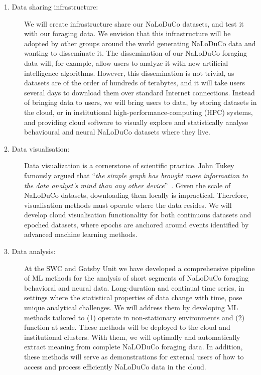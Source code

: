 \begin{description}

    \item[1. Data sharing infrastructure:] We will create infrastructure share
        our NaLoDuCo datasets, and test it with our foraging data. We envision
        that this infrastructure will be adopted by other groups around the
        world generating NaLoDuCo data and wanting to disseminate it. The
        dissemination of our NaLoDuCo foraging data will, for example, allow
        users to analyze it with new artificial intelligence algorithms.
%
        However, this dissemination is not trivial, as datasets are of the
        order of hundreds of terabytes, and it will take users several days to
        download them over standard Internet connections. Instead of bringing
        data to users, we will bring users to data, by storing datasets in the
        cloud, or in institutional high-performance-computing (HPC) systems,
        and providing cloud software to visually explore and statistically
        analyse behavioural and neural NaLoDuCo datasets where they live.

    \item[2. Data visualisation:] Data visualization is a cornerstone of
        scientific practice. John Tukey famously argued that ``\emph{the simple
        graph has brought more information to the data analyst’s mind than any
        other device}''~\citep{tukey62}.
        Given the scale of NaLoDuCo datasets, downloading them locally is
        impractical. Therefore, visualisation methods must operate where the
        data resides.
        We will develop cloud visualisation functionality for both continuous
        datasets and epoched datasets, where epochs are anchored around events
        identified by advanced machine learning methods.

    \item[3. Data analysis:] At the SWC and Gatsby Unit we have developed a
        comprehensive pipeline of ML methods for the analysis of short segments
        of NaLoDuCo foraging behavioral and neural data.
        Long-duration and continual time series, in settings where the
        statistical properties of data change with time, pose unique analytical
        challenges.
        We will address them by developing ML methods tailored to (1) operate
        in non-stationary environments and (2) function at scale.
        These methods will be deployed to the cloud and institutional clusters.
        With them, we will optimally and automatically extract meaning from
        complete NaLODuCo foraging data.
        In addition, these methods will serve as demonstrations for external
        users of how to access and process efficiently NaLoDuCo data in the
        cloud.


\end{description}
